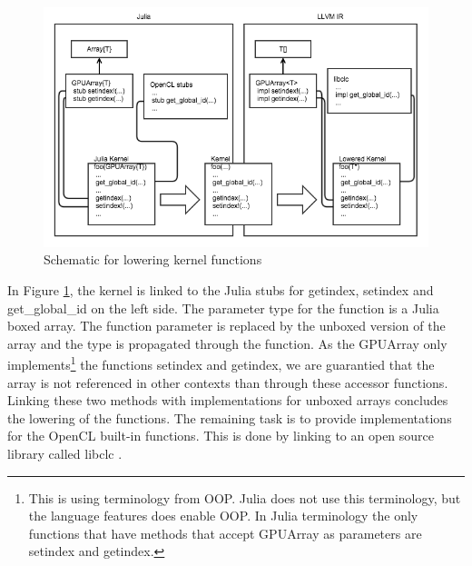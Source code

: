 \begin{markdown}
\begin{figure}[H]
  \centering
  \includegraphics[width=1\textwidth]{body/figures/lowering_schematic.png}
  \caption{Schematic for lowering kernel functions}
  \label{fig:lowering}
\end{figure}

In Figure \ref{fig:lowering}, the kernel is linked to the Julia stubs
for getindex, setindex and get_global_id on the left side. The
parameter type for the function is a Julia boxed array. The function
parameter is replaced by the unboxed version of the array and the type
is propagated through the function. As the GPUArray only
implements\footnote{This is using terminology from OOP. Julia does not
  use this terminology, but the language features does enable OOP. In
  Julia terminology the only functions that have methods that accept
  GPUArray as parameters are setindex and getindex.} the functions
setindex and getindex, we are guarantied that the array is not
referenced in other contexts than through these accessor functions.
Linking these two methods with implementations for unboxed arrays
concludes the lowering of the functions. The remaining task is to
provide implementations for the OpenCL built-in functions. This is done
by linking to an open source library called libclc \cite{libclc}.

  
\end{markdown}
